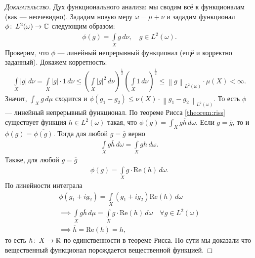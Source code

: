 \begin{proof}[\normalfont\textsc{Доказательство}]
Дух функционального анализа: мы сводим всё к функционалам (как --- неочевидно). Зададим новую меру $\omega = \mu + \nu$ и зададим функционал $\phi \colon\, L^{2}(\omega) \to \mathbb{C} $ следующим образом: \begin{align*}
 \phi(g) = \int\limits_{X} g \, d\nu, \quad g \in L^{2}(\omega)
.\end{align*} Проверим, что $\phi$ --- линейный непрерывный функционал (ещё и корректно заданный). Докажем корретность: \begin{align*}
\int\limits_{X} \left| g \right| \, d\nu = \int\limits_{X} \left| g \right| \cdot 1 \, d\nu  \leqslant \left( \int\limits_{X} \left| g \right|^{2} \, d\nu \right)^{\frac{1}{2}} \left( \int\limits_{X} 1 \, d\nu   \right)^{\frac{1}{2}} \leqslant \left\| g \right\|_{L^{2}(\omega)} \cdot \mu(X) < \infty
.\end{align*} Значит, $\int_{X} g \, d\mu  $ сходится и $\phi(g_1 - g_2) \leqslant \nu(X) \cdot \left\| g_1 - g_2 \right\|_{L^{2}(\omega)}$. То есть $\phi$ --- линейный непрерывный функционал. По теореме Рисса \ref{theorem:riss} существует функция $h \in L^{2}(\omega)$ такая, что $\phi(g) = \int_{X} g\overline{h} \, d\omega  $. Если $g = \overline{g}$, то и  $\phi(g) = \overline{\phi(g)}$. Тогда для любой $g = \overline{g}$ верно \begin{align*}
\int\limits_{X} g \overline{h} \, d\omega   = \int\limits_{X} gh \, d\omega  
.\end{align*} Также, для любой $g = \overline g$ \begin{align*}
\phi(g) = \int\limits_{X} g \cdot \mathrm{Re} (h) \, d\omega  
.\end{align*} По линейности интеграла \begin{align*}
\phi(g_1 + i g_2) = \int\limits_{X} (g_1 + i g_2) \mathrm{Re}(h) \, d\omega  \\
\implies \int\limits_{X} g \overline{h} \, d\mu   = \int\limits_{X} g \cdot \mathrm{Re}(h) \, d\omega   \quad \forall g \in L^{2}(\omega) \\
\implies \overline{h} = \mathrm{Re}(h) = h
,\end{align*} то есть $h \colon\, X \to \mathbb{R}  $ по единственности в теореме Рисса. По сути мы доказали что вещественный функционал порождается вещественной функцией.


\end{proof}
